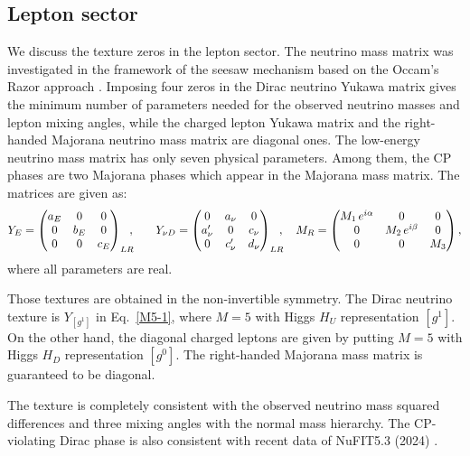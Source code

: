 \documentclass[a4paper,11pt]{article}
\numberwithin{equation}{section}
\begin{document}


\subsection{Lepton sector}
We discuss the texture zeros in the lepton sector.
 The neutrino mass matrix was investigated in the framework of the seesaw mechanism based on the Occam's Razor approach
 \cite{Kaneta:2016gbq}. Imposing four zeros in the Dirac neutrino Yukawa matrix gives the minimum number of parameters needed for the observed neutrino masses
and lepton mixing angles, while the charged lepton Yukawa matrix and the right-handed Majorana neutrino mass matrix are diagonal ones. The low-energy neutrino mass matrix has only seven physical parameters. Among them, the  CP phases are two Majorana phases which appear in the Majorana mass matrix.
 The matrices are given as:
\begin{align}
&  Y_E =
\begin{pmatrix}
 a_E &0 & 0 \\ 0 & b_E& 0\\ 0& 0& c_E
\end{pmatrix}_{LR}\hskip -2mm,
\quad
&  Y_{\nu D} =
\begin{pmatrix}
0  &  a_\nu &0  \\
a'_\nu&0& c_\nu \\
0& c'_\nu& d_\nu
\end{pmatrix}_{LR}\hskip -2mm,
\quad
M_R =
\begin{pmatrix}
M_{1}\, e^{i \alpha} &0 &0  \\
0 & M_{2}\, e^{i \beta}  & 0\\
0& 0& M_{3}
\end{pmatrix},
\label{texture-lepton}
\end{align}
where all parameters are real.

Those textures are obtained in the non-invertible symmetry.
The Dirac neutrino texture is  $Y_{[g^1]}$
in  Eq.~\eqref{M5-1}, where $M=5$ with Higgs $H_U$ representation $[g^1]$.
On the other hand, the diagonal charged leptons 
are given by putting  $M=5$ with Higgs $H_D$ representation $[g^0]$.
The right-handed Majorana mass matrix is guaranteed to be diagonal.


 
The texture is completely consistent with the observed
neutrino mass squared differences and 
three mixing angles with the normal mass hierarchy.
The CP-violating Dirac phase is also consistent with recent data
of NuFIT5.3 (2024)  \cite{Esteban:2020cvm}.
\end{document}
